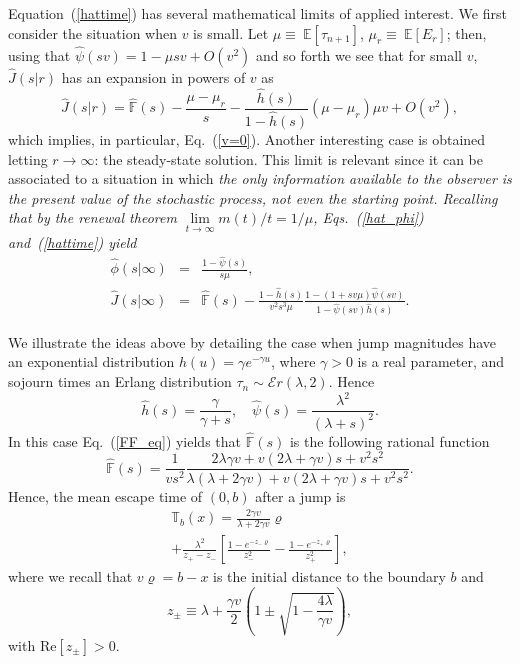\documentclass[english,aps,a4paper,twocolumn,showpacs,showkeys,amsfonts,amsmath,amssymb,amscd,nofootinbib]{revtex4}
\newcommand{\zrp}{z_+}
\newcommand{\zrm}{z_-}
\newcommand{\1}{\'\i}
\newcommand{\EE}{\mathbb{E}}
\newcommand{\TT}{\mathbb{T}}\newcommand{\FF}{\mathbb{F}}
\def\un{\underset}\def\Un{\un{n=1}\to{\ov{\inf}\to\cap}}
\begin{document}
Equation~(\ref{hattime}) has several mathematical limits of applied interest. We first consider the situation when $v$ is small. Let $\mu\equiv~\EE[\tau_{n+1}]$, $\mu_r\equiv~\EE[E_{r}]$; then, using   that $  \hat{\psi}(s v )=1-\mu sv
+O(v^2)$ and so forth we see that for  small $v$, $\hat{ J}(s|r)$
has an expansion in powers of $v$ as
 \begin{equation}
\hat{J}(s|r) =  \hat{\FF}(s) - \frac{\mu-\mu_r}{s}  -    \frac{
\hat{h}(s) }{ 1- \hat{h}(s) }   (\mu-\mu_r)\mu  v + O(v^2),
\end{equation}
which implies, in particular, Eq.~(\ref{v=0}). Another interesting
case is obtained letting $r\to\infty$: the steady-state solution.
This limit is relevant since it  can be associated to a
situation  in which \it the only information available to the
observer is the present value of the stochastic process, not even
the starting point\rm. Recalling that by the renewal theorem
$\un{t\to\infty}\lim m(t)/t = 1/\mu$,  Eqs.~(\ref{hat_phi}) and~(\ref{hattime}) yield
 \begin{eqnarray} \hat\phi (s|\infty)
&=&  \frac{1-\hat \psi(s)}{s\mu},  \\
\hat{J}(s|\infty) &=&
\hat{\FF}(s)- \frac{ 1- \hat{h}(s) }{v^2 s^3 \mu}
\frac{1-(1+s v\mu)\hat \psi(sv)}{ 1-\hat{\psi}(s
v)\hat{h}(s)}.
\end{eqnarray}

 We  illustrate the ideas above by detailing the case when jump magnitudes
  have
an exponential distribution
  $h(u)=\gamma e^{-\gamma u}$, where $\gamma>0$ is a real parameter, and  sojourn times
 an Erlang distribution $\tau_n\sim\mathcal Er(\lambda,2)$.
Hence
\begin{equation}
\hat{h}(s)= \frac{\gamma}{\gamma +s},\quad  \hat{\psi}(s)  = \frac{\lambda^2}{(\lambda +s)^2}. 
\label{h_hat}
\end{equation}
In this case Eq.~(\ref{FF_eq})  yields that $\hat{\FF}(s)$ is the
following rational function
 \begin{equation}
\hat{\FF}(s)=\frac{1}{v s^2}\frac{2\lambda \gamma v+ v(2 \lambda
+\gamma v) s + v^2 s^2}{\lambda (\lambda + 2\gamma v) + v(2
\lambda +\gamma v) s+v^2 s^2}.
 \end{equation}
 Hence, the mean  escape  time of $(0,b)$ after a jump is
  \begin{eqnarray}
  \TT_b(x)= \frac{2 \gamma v}{\lambda + 2 \gamma v} \varrho \nonumber\\
+\frac{\lambda^2}{\zrp-\zrm}\left[\frac{1-e^{-\zrm \varrho}}{\zrm^2}-\frac{1-e^{-\zrp
\varrho}}{\zrp^2}\right],
\end{eqnarray}
where we recall that $v \varrho=b-x$ is   the  initial
      distance to the boundary $b$
  and
\begin{equation}
z_{\pm}\equiv
 \lambda +\frac{\gamma v}{2}\left(1\pm\sqrt{1-\frac{4\lambda}{\gamma
v}}\right),
\end{equation}
with $\mbox{Re}[z_{\pm}]>0$.
\end{document}
